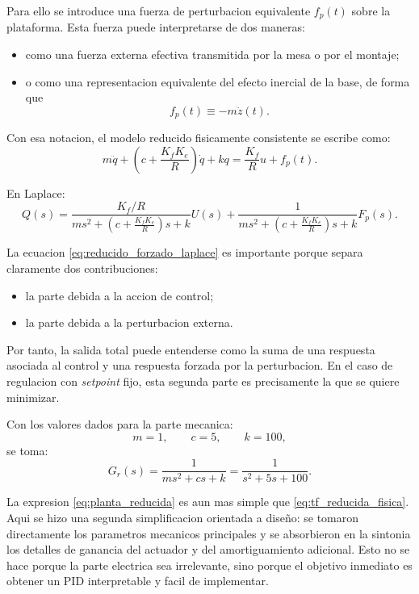 \documentclass[11pt]{article}
\begin{document}
Para ello se introduce una fuerza de perturbacion equivalente $f_p(t)$ sobre la plataforma. Esta fuerza puede interpretarse de dos maneras:

\begin{itemize}[leftmargin=1.2cm]
\item como una fuerza externa efectiva transmitida por la mesa o por el montaje;
\item o como una representacion equivalente del efecto inercial de la base, de forma que
\[
f_p(t)\equiv -m\ddot z(t).
\]
\end{itemize}

Con esa notacion, el modelo reducido fisicamente consistente se escribe como:
\begin{equation}
m\ddot q + \left(c+\frac{K_fK_e}{R}\right)\dot q + kq = \frac{K_f}{R}u + f_p(t).
\label{eq:modelo_reducido_forzado}
\end{equation}

En Laplace:
\begin{equation}
Q(s)=\frac{K_f/R}{ms^2+\left(c+\frac{K_fK_e}{R}\right)s+k}U(s)
+\frac{1}{ms^2+\left(c+\frac{K_fK_e}{R}\right)s+k}F_p(s).
\label{eq:reducido_forzado_laplace}
\end{equation}

La ecuacion \eqref{eq:reducido_forzado_laplace} es importante porque separa claramente dos contribuciones:

\begin{itemize}[leftmargin=1.2cm]
\item la parte debida a la accion de control;
\item la parte debida a la perturbacion externa.
\end{itemize}

Por tanto, la salida total puede entenderse como la suma de una respuesta asociada al control y una respuesta forzada por la perturbacion. En el caso de regulacion con \textit{setpoint} fijo, esta segunda parte es precisamente la que se quiere minimizar.

Con los valores dados para la parte mecanica:
\[
m=1,\qquad c=5,\qquad k=100,
\]
se toma:
\begin{equation}
G_r(s)=\frac{1}{ms^2+cs+k}
=
\frac{1}{s^2+5s+100}.
\label{eq:planta_reducida}
\end{equation}

La expresion \eqref{eq:planta_reducida} es aun mas simple que \eqref{eq:tf_reducida_fisica}. Aqui se hizo una segunda simplificacion orientada a dise\~no: se tomaron directamente los parametros mecanicos principales y se absorbieron en la sintonia los detalles de ganancia del actuador y del amortiguamiento adicional. Esto no se hace porque la parte electrica sea irrelevante, sino porque el objetivo inmediato es obtener un PID interpretable y facil de implementar.
\end{document}
